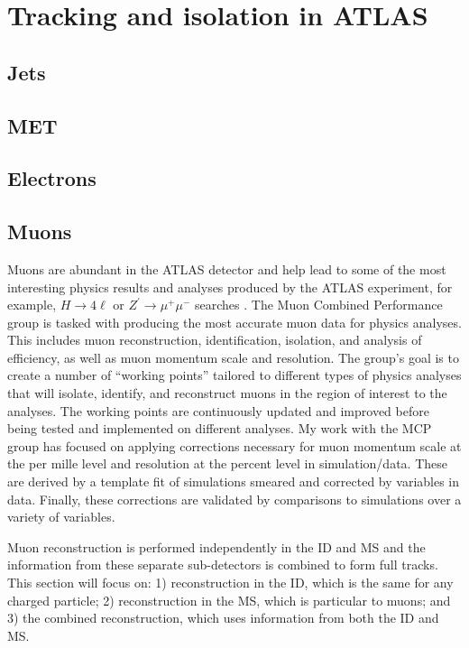 \section{Tracking and isolation in ATLAS}
\subsection{Jets}
\subsection{MET}
\subsection{Electrons}
\subsection{Muons}
Muons are abundant in the ATLAS detector and help lead to some of the most interesting physics results and analyses produced by the ATLAS experiment, for example, $H \rightarrow 4\ell$ or $Z^\prime \rightarrow \mu^+\mu^-$ searches \cite{4l}. The Muon Combined Performance group is tasked with producing the most accurate muon data for physics analyses. This includes muon reconstruction, identification, isolation, and analysis of efficiency, as well as muon momentum scale and resolution. The group's goal is to create a number of ``working points'' tailored to different types of physics analyses that will isolate, identify, and reconstruct muons in the region of interest to the analyses. The working points are continuously updated and improved before being tested and implemented on different analyses. My work with the MCP group has focused on applying corrections necessary for muon momentum scale at the per mille level and resolution at the percent level in simulation/data. These are derived by a template fit of simulations smeared and corrected by variables in data. Finally, these corrections are validated by comparisons to simulations over a variety of variables. 

Muon reconstruction is performed independently in the ID and MS and the information from these separate sub-detectors is combined to form full tracks. This section will focus on: 1) reconstruction in the ID, which is the same for any charged particle; 2) reconstruction in the MS, which is particular to muons; and 3) the combined reconstruction, which uses information from both the ID and MS. 


